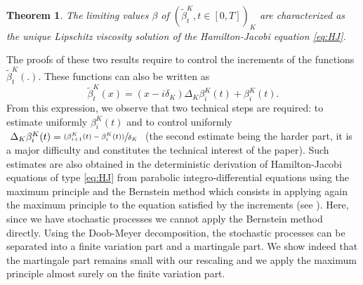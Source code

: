 \documentclass[10pt]{amsart}
\newcommand{\psfrac}[2]{\sfrac{(#1)}{#2}}
\theoremstyle{plain}
\newtheorem{theorem}{Theorem}[section]
\theoremstyle{remark}
\begin{document}
\begin{theorem}
\label{thm:identification}
The limiting values $\beta$ of $(\tilde \beta^K_{t}, t\in[0,T])_{K}$ are characterized as {the} unique Lipschitz viscosity solution of the Hamilton-Jacobi equation \eqref{eq:HJ}.
\end{theorem}

The proofs of these two results require to control the increments of the functions $\widetilde \beta^K_{t}(.)$.
These functions
can also be written as \[\widetilde
\beta^K_{t}(x)
=(x-i\delta_K)\Delta_K\beta^K_i(t)+\beta^K_i(t).\]
From this expression, we observe that two technical steps are required: to estimate uniformly $\beta_{i}^K(t)$ and to control uniformly $\ \Delta_K\beta^K_i(t)=\psfrac{\beta_{i+1}^K(t)-\beta_{i}^K(t)}{\delta_K}\ $ (the second estimate being the harder part, it is a major difficulty and constitutes the technical interest of the paper). Such estimates are also obtained in the deterministic derivation of Hamilton-Jacobi equations of type \eqref{eq:HJ} from parabolic integro-differential equations using the maximum principle and the Bernstein method which consists in applying again the maximum principle to the equation satisfied by the increments (see \cite{Barles2009}). Here, since we have stochastic processes we cannot apply the Bernstein method directly. Using the Doob-Meyer decomposition, the stochastic processes can be separated into a finite variation part and a martingale part. We show indeed that the martingale part remains small with our rescaling and we apply the maximum principle almost surely on the finite variation part.
\end{document}
